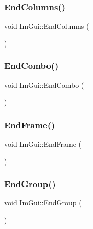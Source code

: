 \mbox{\label{namespace_im_gui_af93bed3bce5475fe4d525d744f16aa20}} 
\subsubsection{\texorpdfstring{End\+Columns()}{EndColumns()}}
{\footnotesize\ttfamily void Im\+Gui\+::\+End\+Columns (\begin{DoxyParamCaption}{ }\end{DoxyParamCaption})}

\mbox{\label{namespace_im_gui_a63434692d7de278875c7ea0143fbe6e4}} 
\subsubsection{\texorpdfstring{End\+Combo()}{EndCombo()}}
{\footnotesize\ttfamily void Im\+Gui\+::\+End\+Combo (\begin{DoxyParamCaption}{ }\end{DoxyParamCaption})}

\mbox{\label{namespace_im_gui_a246c37da45e88a12ade440a0feacb4ee}} 
\subsubsection{\texorpdfstring{End\+Frame()}{EndFrame()}}
{\footnotesize\ttfamily void Im\+Gui\+::\+End\+Frame (\begin{DoxyParamCaption}{ }\end{DoxyParamCaption})}

\mbox{\label{namespace_im_gui_a05fc97fc64f28a55486087f503d9a622}} 
\subsubsection{\texorpdfstring{End\+Group()}{EndGroup()}}
{\footnotesize\ttfamily void Im\+Gui\+::\+End\+Group (\begin{DoxyParamCaption}{ }\end{DoxyParamCaption})}

